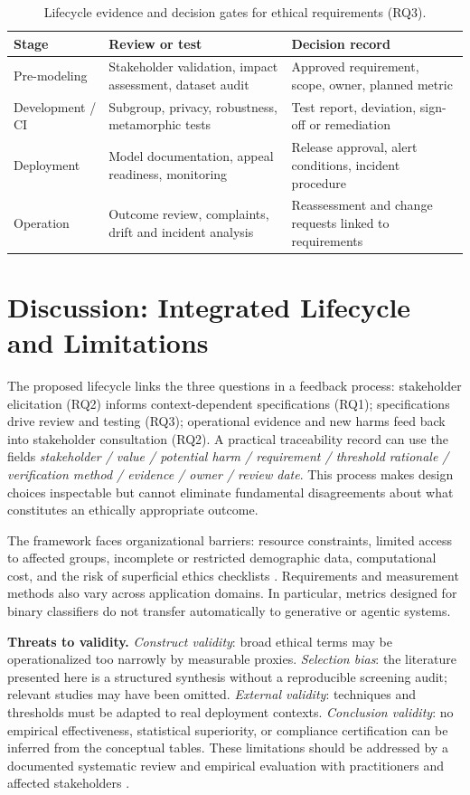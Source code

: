 \documentclass[11pt,a4paper]{article}
\begin{document}
\begin{table}[htbp]
\centering\small
\caption{Lifecycle evidence and decision gates for ethical requirements (RQ3).}\label{tab:vv}
\begin{tabularx}{\linewidth}{p{2.4cm}X X}
\toprule
\textbf{Stage} & \textbf{Review or test} & \textbf{Decision record}\\\midrule
Pre-modeling & Stakeholder validation, impact assessment, dataset audit & Approved requirement, scope, owner, planned metric\\
Development / CI & Subgroup, privacy, robustness, metamorphic tests & Test report, deviation, sign-off or remediation\\
Deployment & Model documentation, appeal readiness, monitoring & Release approval, alert conditions, incident procedure\\
Operation & Outcome review, complaints, drift and incident analysis & Reassessment and change requests linked to requirements\\
\bottomrule
\end{tabularx}
\end{table}

\section{Discussion: Integrated Lifecycle and Limitations}
The proposed lifecycle links the three questions in a feedback process: stakeholder elicitation (RQ2) informs context-dependent specifications (RQ1); specifications drive review and testing (RQ3); operational evidence and new harms feed back into stakeholder consultation (RQ2). A practical traceability record can use the fields \emph{stakeholder / value / potential harm / requirement / threshold rationale / verification method / evidence / owner / review date}. This process makes design choices inspectable but cannot eliminate fundamental disagreements about what constitutes an ethically appropriate outcome.

The framework faces organizational barriers: resource constraints, limited access to affected groups, incomplete or restricted demographic data, computational cost, and the risk of superficial ethics checklists \cite{floridi2019,morley2020}. Requirements and measurement methods also vary across application domains. In particular, metrics designed for binary classifiers do not transfer automatically to generative or agentic systems.

\textbf{Threats to validity.} \emph{Construct validity}: broad ethical terms may be operationalized too narrowly by measurable proxies. \emph{Selection bias}: the literature presented here is a structured synthesis without a reproducible screening audit; relevant studies may have been omitted. \emph{External validity}: techniques and thresholds must be adapted to real deployment contexts. \emph{Conclusion validity}: no empirical effectiveness, statistical superiority, or compliance certification can be inferred from the conceptual tables. These limitations should be addressed by a documented systematic review and empirical evaluation with practitioners and affected stakeholders \cite{wohlin2012}.
\end{document}

